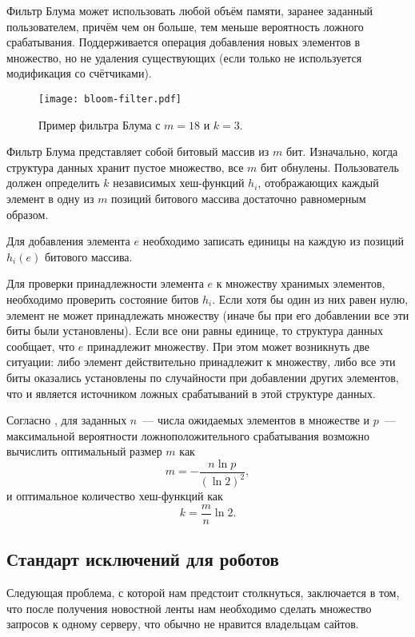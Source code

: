Фильтр Блума может использовать любой объём памяти, заранее заданный пользователем, причём чем он больше, тем меньше вероятность ложного срабатывания. Поддерживается операция добавления новых элементов в множество, но не удаления существующих (если только не используется модификация со счётчиками).

\begin{figure}[h]
    \centering
    \texttt{[image: bloom-filter.pdf]}
    \caption{Пример фильтра Блума с $m=18$ и $k=3$.}
\end{figure}

Фильтр Блума представляет собой битовый массив из $m$ бит. Изначально, когда структура данных хранит пустое множество, все $m$ бит обнулены. Пользователь должен определить $k$ независимых хеш-функций $h_i$, отображающих каждый элемент в одну из $m$ позиций битового массива достаточно равномерным образом.

Для добавления элемента $e$ необходимо записать единицы на каждую из позиций $h_i(e)$ битового массива.

Для проверки принадлежности элемента $e$ к множеству хранимых элементов, необходимо проверить состояние битов $h_i$. Если хотя бы один из них равен нулю, элемент не может принадлежать множеству (иначе бы при его добавлении все эти биты были установлены). Если все они равны единице, то структура данных сообщает, что $e$ принадлежит множеству. При этом может возникнуть две ситуации: либо элемент действительно принадлежит к множеству, либо все эти биты оказались установлены по случайности при добавлении других элементов, что и является источником ложных срабатываний в этой структуре данных.

Согласно \cite{broder02}, для заданных $n$~--- числа ожидаемых элементов в множестве и $p$~--- максимальной вероятности ложноположительного срабатывания возможно вычислить оптимальный размер $m$ как
\begin{equation}
    m=-\frac{n\ln p}{(\ln 2)^2},
\end{equation}
и оптимальное количество хеш-функций как
\begin{equation}
    k=\frac{m}{n}\ln 2.
\end{equation}

\subsection{Стандарт исключений для роботов} \label{ssec:robotstxt}
Следующая проблема, с которой нам предстоит столкнуться, заключается в том, что после получения новостной ленты нам необходимо сделать множество запросов к одному серверу, что обычно не нравится владельцам сайтов.

